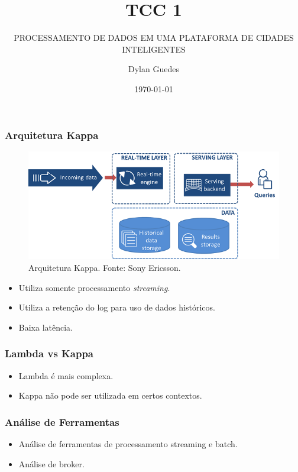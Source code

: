 \documentclass{beamer}
\title{TCC 1}
\subtitle{PROCESSAMENTO DE DADOS EM UMA PLATAFORMA DE CIDADES INTELIGENTES}
\author{Dylan Guedes}
\institute{UnB Gama}
\date{\today}
\begin{document}
  
  
  
  
  
  
  
  
  
  
  

  \begin{frame}
      \frametitle{Arquitetura Kappa}
      \begin{figure}
          \includegraphics[scale=0.4]{figures/KappaArchitecture.png}
          \caption{Arquitetura Kappa. Fonte: Sony Ericsson.}
      \end{figure}
      \begin{itemize}
          \item Utiliza somente processamento \textit{streaming}.
          \item Utiliza a retenção do log para uso de dados históricos.
          \item Baixa latência.
      \end{itemize}
  \end{frame}
  
  \begin{frame}
      \frametitle{Lambda vs Kappa}
      \begin{itemize}
          \item Lambda é mais complexa.
          \item Kappa não pode ser utilizada em certos contextos.
      \end{itemize}
  \end{frame}

  \begin{frame}
      \frametitle{Análise de Ferramentas}
      \begin{itemize}
          \item Análise de ferramentas de processamento streaming e batch.
          \item Análise de broker.
      \end{itemize}
  \end{frame}
\end{document}
